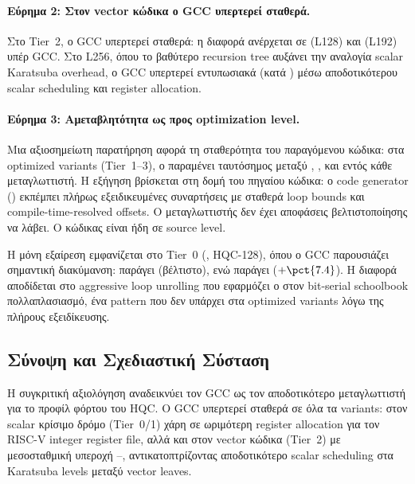 \paragraph{Εύρημα 2: Στον vector κώδικα ο GCC υπερτερεί σταθερά.}
Στο Tier~2, ο GCC υπερτερεί σταθερά: η διαφορά
ανέρχεται σε  (L128) και  (L192) υπέρ GCC.
Στο L256, όπου το βαθύτερο recursion tree αυξάνει την
αναλογία scalar Karatsuba overhead, ο GCC υπερτερεί εντυπωσιακά (κατά )
μέσω αποδοτικότερου scalar scheduling και register allocation.

\paragraph{Εύρημα 3: Αμεταβλητότητα ως προς optimization level.}
Μια αξιοσημείωτη παρατήρηση αφορά τη σταθερότητα του παραγόμενου κώδικα:
στα optimized variants (Tier~1–3), ο \instret παραμένει ταυτόσημος μεταξύ
, , και  εντός κάθε μεταγλωττιστή. Η εξήγηση
βρίσκεται στη δομή του πηγαίου κώδικα: ο code generator
() εκπέμπει πλήρως εξειδικευμένες
συναρτήσεις με σταθερά loop bounds και compile-time-resolved offsets.
Ο μεταγλωττιστής δεν έχει αποφάσεις βελτιστοποίησης να λάβει. Ο κώδικας
είναι ήδη  σε source level.

Η μόνη εξαίρεση εμφανίζεται στο Tier~0 (, HQC-128), όπου ο
GCC παρουσιάζει σημαντική διακύμανση:  παράγει 
\instret (βέλτιστο), ενώ  παράγει  ($+\pct{7.4}$).
Η διαφορά αποδίδεται στο aggressive loop unrolling που εφαρμόζει ο
 στον bit-serial schoolbook πολλαπλασιασμό, ένα pattern που
δεν υπάρχει στα optimized variants λόγω της πλήρους εξειδίκευσης.

\subsection{Σύνοψη και Σχεδιαστική Σύσταση}
\label{ssec:compiler-summary}

Η συγκριτική αξιολόγηση αναδεικνύει τον GCC ως τον αποδοτικότερο
μεταγλωττιστή για το προφίλ φόρτου του HQC. Ο GCC υπερτερεί σταθερά σε
όλα τα variants: στον scalar κρίσιμο δρόμο (Tier~0/1) χάρη σε ωριμότερη register
allocation για τον RISC-V integer register file, αλλά και στον vector κώδικα
(Tier~2) με μεσοσταθμική υπεροχή –, αντικατοπτρίζοντας
αποδοτικότερο scalar scheduling στα Karatsuba levels μεταξύ vector leaves.

